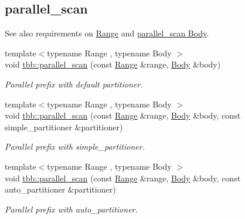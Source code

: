 \subsection*{parallel\+\_\+scan}
\label{_amgrpea856f699c9d234ea9f5ed535b0b16bb}%
See also requirements on \hyperlink{range_req}{Range} and \hyperlink{parallel_scan_body_req}{parallel\+\_\+scan Body}. \begin{DoxyCompactItemize}
\item 
{\footnotesize template$<$typename Range , typename Body $>$ }\\void \hyperlink{group__algorithms_gae7eaaf124471a6c603b28fc925e8fbbb}{tbb\+::parallel\+\_\+scan} (const \hyperlink{classtbb_1_1blocked__range}{Range} \&range, \hyperlink{classBody}{Body} \&body)
\begin{DoxyCompactList}\small\item\em Parallel prefix with default partitioner. \end{DoxyCompactList}\item 
{\footnotesize template$<$typename Range , typename Body $>$ }\\void \hyperlink{group__algorithms_ga7ddacf5e49f1bea9b67803f2d0f57531}{tbb\+::parallel\+\_\+scan} (const \hyperlink{classtbb_1_1blocked__range}{Range} \&range, \hyperlink{classBody}{Body} \&body, const simple\+\_\+partitioner \&partitioner)
\begin{DoxyCompactList}\small\item\em Parallel prefix with simple\+\_\+partitioner. \end{DoxyCompactList}\item 
{\footnotesize template$<$typename Range , typename Body $>$ }\\void \hyperlink{group__algorithms_ga3548041731b7fa14f30f155541ceebb9}{tbb\+::parallel\+\_\+scan} (const \hyperlink{classtbb_1_1blocked__range}{Range} \&range, \hyperlink{classBody}{Body} \&body, const auto\+\_\+partitioner \&partitioner)
\begin{DoxyCompactList}\small\item\em Parallel prefix with auto\+\_\+partitioner. \end{DoxyCompactList}\end{DoxyCompactItemize}
